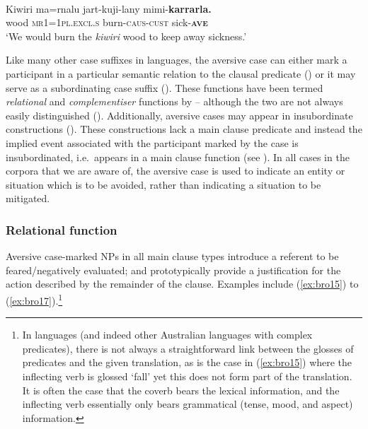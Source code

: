 \documentclass[output=paper,colorlinks,citecolor=brown]{langscibook}
\begin{document}
\ea
{} {\citealt{richards_interactive_2012}} \\
\gll Kiwiri ma=rnalu jart-kuji-lany mimi-\textbf{karrarla.} \\
wood \textsc{mr1=1pl.excl.s} burn-\textsc{caus-cust} sick-\textbf{\textsc{ave}} \\
\glt `We would burn the \textit{kiwiri} wood to keep away sickness.' 
\label{ex:bro14}
\z

\noindent Like many other case suffixes in  languages, the aversive case can either mark a participant in a particular semantic relation to the clausal predicate () or it may serve as a subordinating case suffix (). These functions have been termed \textit{relational} and \textit{complementiser} functions by \citet{dench_multiple_1988} -- although the two are not always easily distinguished (). Additionally, aversive cases may appear in insubordinate constructions (). These constructions lack a main clause predicate and instead the implied event associated with the participant marked by the case is insubordinated, i.e.\  appears in a main clause function (see \cite{evans_insubordination_2016}). In all cases in the corpora that we are aware of, the aversive case is used to indicate an entity or situation which is to be avoided, rather than indicating a situation to be mitigated.

\subsubsection{Relational function}
\label{subsubsec:relational}

Aversive case-marked NPs in all main clause types introduce a referent to be feared/negatively evaluated; and prototypically provide a justification for the action described by the remainder of the clause. Examples include (\ref{ex:bro15}) to (\ref{ex:bro17}).\footnote{In  languages (and indeed other Australian languages with complex predicates), there is not always a straightforward link between the glosses of predicates and the given translation, as is the case in (\ref{ex:bro15}) where the inflecting verb is glossed `fall' yet this does not form part of the translation. It is often the case that the coverb bears the lexical information, and the inflecting verb essentially only bears grammatical (tense, mood, and aspect) information.}  
\end{document}
